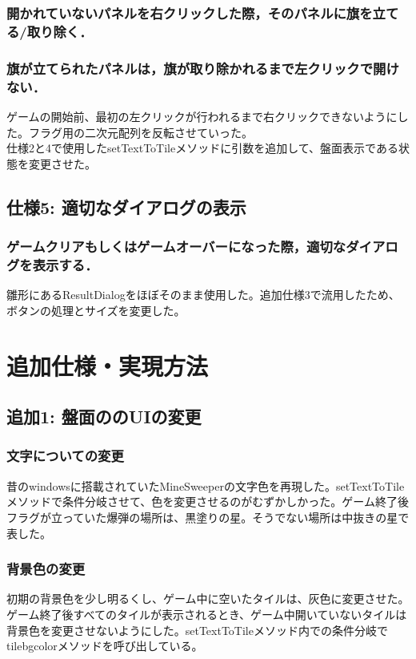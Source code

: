 \documentclass[a4j,12pt]{jsarticle}
\begin{document}
\subsubsection*{開かれていないパネルを右クリックした際，そのパネルに旗を立てる/取り除く．}
\subsubsection*{旗が立てられたパネルは，旗が取り除かれるまで左クリックで開けない．}
ゲームの開始前、最初の左クリックが行われるまで右クリックできないようにした。フラグ用の二次元配列を反転させていった。\\
仕様2と4で使用したsetTextToTileメソッドに引数を追加して、盤面表示である状態を変更させた。

\subsection{仕様5: 適切なダイアログの表示}
\subsubsection*{ゲームクリアもしくはゲームオーバーになった際，適切なダイアログを表示する．}
雛形にあるResultDialogをほぼそのまま使用した。追加仕様3で流用したため、ボタンの処理とサイズを変更した。

\section{追加仕様・実現方法}

\subsection{追加1: 盤面ののUIの変更}
\subsubsection*{文字についての変更}
昔のwindowsに搭載されていたMineSweeperの文字色を再現した。setTextToTileメソッドで条件分岐させて、色を変更させるのがむずかしかった。ゲーム終了後フラグが立っていた爆弾の場所は、黒塗りの星。そうでない場所は中抜きの星で表した。
\subsubsection*{背景色の変更}
初期の背景色を少し明るくし、ゲーム中に空いたタイルは、灰色に変更させた。ゲーム終了後すべてのタイルが表示されるとき、ゲーム中開いていないタイルは背景色を変更させないようにした。setTextToTileメソッド内での条件分岐でtilebgcolorメソッドを呼び出している。
\end{document}
